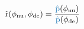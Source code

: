 \begin{equation*}
  \pdrh(\phinu, \phide) = \frac{
    \textcolor{mymidblue}{\hat{\pd}}(\phinu)
  } {
    \textcolor{mymidblue}{\hat{\pd}}(\phide)
  }
\end{equation*}